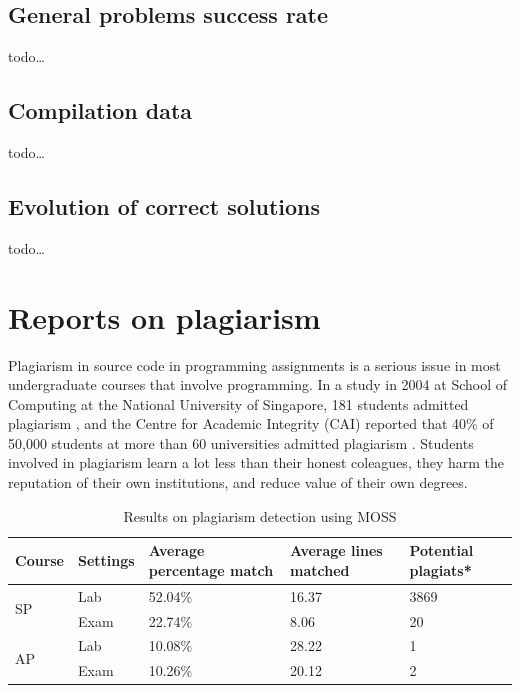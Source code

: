 \documentclass{llncs}
\begin{document}
\subsection{General problems success rate}

todo\ldots

\subsection{Compilation data}

todo\ldots

\subsection{Evolution of correct solutions}

todo\ldots

\section{Reports on plagiarism}

Plagiarism in source code in programming assignments is a serious issue in most
undergraduate courses that involve programming. In a study in 2004 at School of
Computing at the National University of Singapore, 181 students admitted
plagiarism \cite{tsang2005survey}, and the Centre for Academic Integrity (CAI)
reported that 40\% of 50,000 students at more than 60 universities admitted
plagiarism \cite{jocoy2006plagiarism}. Students involved in plagiarism learn a
lot less than their honest coleagues, they harm the reputation of their own
institutions, and reduce value of their own degrees.

\begin{table}
\caption{Results on plagiarism detection using MOSS}
\begin{center}
\begin{tabular}{ |l|l|l|l|l| }
\hline
Course & Settings & Average percentage match & Average lines matched & Potential
plagiats*
\\
\hline 
\multirow{2}{*}{SP} & Lab & 52.04\% & 16.37 & 3869 \\
 & Exam & 22.74\% & 8.06 & 20 \\
\hline
\multirow{2}{*}{AP} & Lab & 10.08\% & 28.22 & 1 \\
 & Exam  & 10.26\% & 20.12 & 2 \\
\hline
\end{tabular}
\label{table:plagiarism_results}
\end{center}
\end{table}
\end{document}
